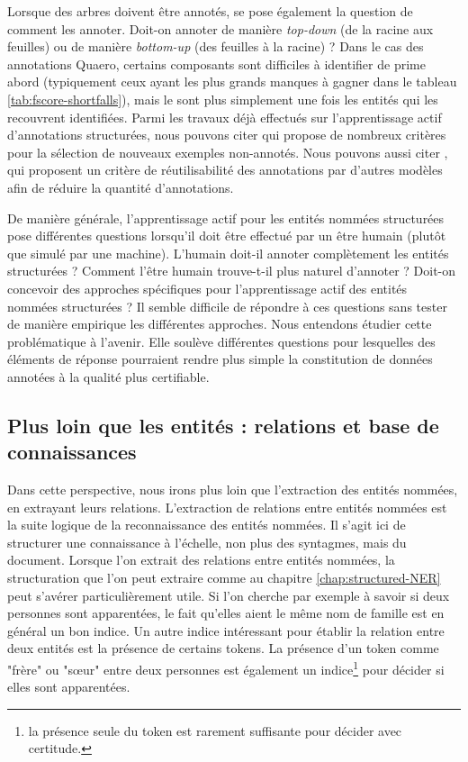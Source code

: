 \documentclass[12pt,a4paper,times,twoside,openright]{report}
\begin{document}
Lorsque des arbres doivent être annotés, se pose également la question de comment les annoter. Doit-on annoter de manière \emph{top-down} (de la racine aux feuilles) ou de manière \emph{bottom-up} (des feuilles à la racine) ? Dans le cas des annotations Quaero, certains composants sont difficiles à identifier de prime abord (typiquement ceux ayant les plus grands manques à gagner dans le tableau \ref{tab:fscore-shortfalls}), mais le sont plus simplement une fois les entités qui les recouvrent identifiées. Parmi les travaux déjà effectués sur l'apprentissage actif d'annotations structurées, nous pouvons citer \citet{hwa2004sample} qui propose de nombreux critères pour la sélection de nouveaux exemples non-annotés. Nous pouvons aussi citer \citet{baldridge2004active}, qui proposent un critère de réutilisabilité des annotations par d'autres modèles afin de réduire la quantité d'annotations.

De manière générale, l'apprentissage actif pour les entités nommées structurées pose différentes questions lorsqu'il doit être effectué par un être humain (plutôt que simulé par une machine). L'humain doit-il annoter complètement les entités structurées ? Comment l'être humain trouve-t-il plus naturel d'annoter ? Doit-on concevoir des approches spécifiques pour l'apprentissage actif des entités nommées structurées ? Il semble difficile de répondre à ces questions sans tester de manière empirique les différentes approches. Nous entendons étudier cette problématique à l'avenir. Elle soulève différentes questions pour lesquelles des éléments de réponse pourraient rendre plus simple la constitution de données annotées à la qualité plus certifiable.



    \subsection{Plus loin que les entités : relations et base de connaissances}
Dans cette perspective, nous irons plus loin que l'extraction des entités nommées, en extrayant leurs relations. L'extraction de relations entre entités nommées est la suite logique de la reconnaissance des entités nommées. Il s'agit ici de structurer une connaissance à l'échelle, non plus des syntagmes, mais du document. Lorsque l'on extrait des relations entre entités nommées, la structuration que l'on peut extraire comme au chapitre \ref{chap:structured-NER} peut s'avérer particulièrement utile. Si l'on cherche par exemple à savoir si deux personnes sont apparentées, le fait qu'elles aient le même nom de famille est en général un bon indice. Un autre indice intéressant pour établir la relation entre deux entités est la présence de certains tokens. La présence d'un token comme "frère" ou "s\oe ur" entre deux personnes est également un indice\footnote{la présence seule du token est rarement suffisante pour décider avec certitude.} pour décider si elles sont apparentées.
\end{document}
